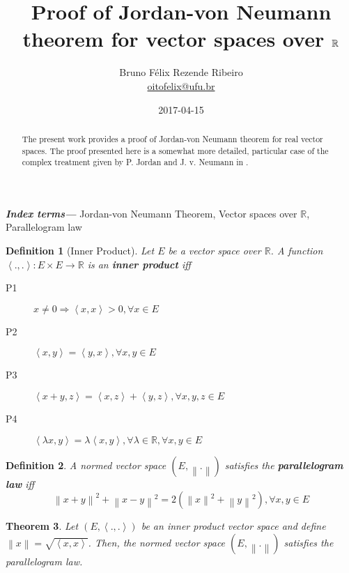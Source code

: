\documentclass{article}
\title{Proof of Jordan-von Neumann theorem for vector spaces over \(\R\)}
\author{Bruno Félix Rezende Ribeiro \\ \href{mailto:oitofelix@ufu.br}{oitofelix@ufu.br}}
\affil{FAMAT --- Universidade Federal de Uberlândia}
\date{2017-04-15}
\newtheorem{theorem}{Theorem}
\newtheorem{definition}[theorem]{Definition}
\providecommand{\keywords}[1]{\textbf{\textit{Index terms---}} #1}
\newcommand{\R}{\mathbb{R}}
\newcommand{\norm}[1]{\left\|#1\right\|}
\newcommand{\ip}[2]{\left\langle #1, #2\right\rangle}
\newcommand{\function}[3]{#1:#2\rightarrow#3}
\begin{document}
\maketitle

\begin{abstract}
  The present work provides a proof of Jordan-von Neumann theorem for
  real vector spaces.  The proof presented here is a somewhat more
  detailed, particular case of the complex treatment given by
  P. Jordan and J. v. Neumann in \cite{JN}.
\end{abstract}

\keywords{Jordan-von Neumann Theorem, Vector spaces over \(\R\),
  Parallelogram law}

\begin{definition}[Inner Product]\label{def_ip}
  Let \(E\) be a vector space over \(\R\).  A function
  \(\function{\ip{.}{.}}{E \times E}{\R}\) is an \textbf{inner
    product} iff
  \begin{description}
  \item[P1]
    \(x \neq 0 \Rightarrow \ip{x}{x} > 0, \forall x \in E\)
  \item[P2]
    \(\ip{x}{y} = \ip{y}{x}, \forall x, y \in E\)
  \item[P3]
    \(\ip{x+y}{z} = \ip{x}{z} + \ip{y}{z}, \forall x, y, z \in E\)
  \item[P4]
    \(\ip{\lambda x}{y} = \lambda\ip{x}{y}, \forall\lambda\in\R,
    \forall x, y \in E\)
  \end{description}
\end{definition}

\begin{definition}
  A normed vector space \((E,\norm{.})\) satisfies the
  \textbf{parallelogram law} iff
  \[\norm{x+y}^2+\norm{x-y}^2=2(\norm{x}^2+\norm{y}^2), \forall x, y
    \in E\]
\end{definition}

\begin{theorem}
  Let \((E,\ip{.}{.})\) be an inner product vector space and define
  \mbox{\(\norm{x} = \sqrt{\ip{x}{x}}\)}.  Then, the normed vector
  space \((E,\norm{.})\) satisfies the parallelogram law.
\end{theorem}
\end{document}
